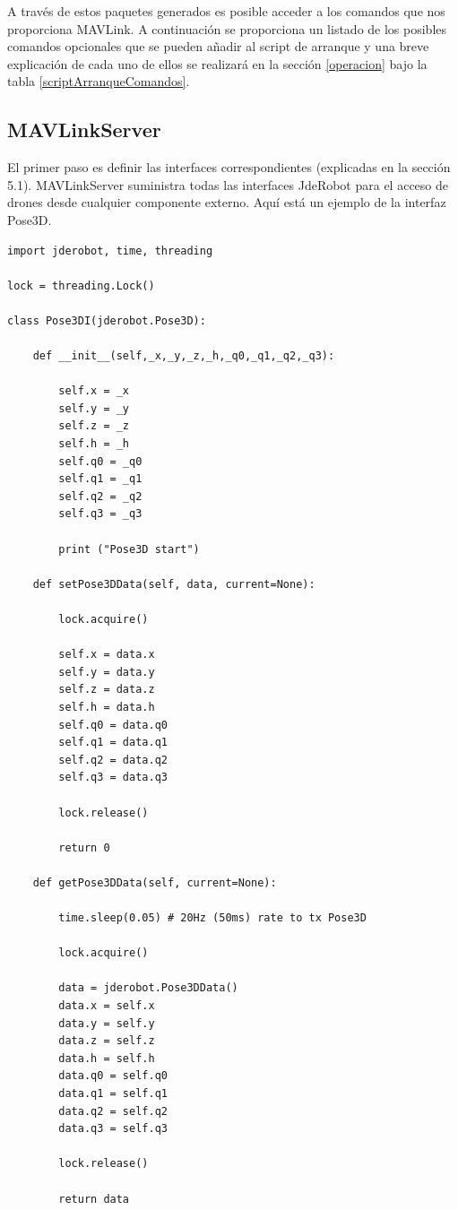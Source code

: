 A través de estos paquetes generados es posible acceder a los comandos que nos proporciona MAVLink. A continuación se proporciona un listado de los posibles comandos opcionales que se pueden añadir al script de arranque y una breve explicación de cada uno de ellos se realizará en la sección \ref{operacion} bajo la tabla \ref{scriptArranqueComandos}.

\subsection{MAVLinkServer}

El primer paso es definir las interfaces correspondientes (explicadas en la sección 5.1). MAVLinkServer suministra todas las interfaces JdeRobot para el acceso de drones desde cualquier componente externo. Aquí está un ejemplo de la interfaz Pose3D.

\begin{lstlisting}[frame=single]
import jderobot, time, threading

lock = threading.Lock()

class Pose3DI(jderobot.Pose3D):

    def __init__(self,_x,_y,_z,_h,_q0,_q1,_q2,_q3):

        self.x = _x
        self.y = _y
        self.z = _z
        self.h = _h
        self.q0 = _q0
        self.q1 = _q1
        self.q2 = _q2
        self.q3 = _q3

        print ("Pose3D start")

    def setPose3DData(self, data, current=None):

        lock.acquire()

        self.x = data.x
        self.y = data.y
        self.z = data.z
        self.h = data.h
        self.q0 = data.q0
        self.q1 = data.q1
        self.q2 = data.q2
        self.q3 = data.q3

        lock.release()

        return 0

    def getPose3DData(self, current=None):

        time.sleep(0.05) # 20Hz (50ms) rate to tx Pose3D

        lock.acquire()

        data = jderobot.Pose3DData()
        data.x = self.x
        data.y = self.y
        data.z = self.z
        data.h = self.h
        data.q0 = self.q0
        data.q1 = self.q1
        data.q2 = self.q2
        data.q3 = self.q3

        lock.release()

        return data
\end{lstlisting}  

